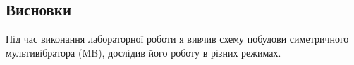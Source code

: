 \documentclass{article}
\begin{document}
\begin{normalsize}
	\section*{Висновки}
	Під час виконання лабораторної роботи я вивчив схему побудови симетричного мультивібратора
	(MB), дослідив його роботу в різних режимах.
	    
\end{normalsize}
\end{document}
